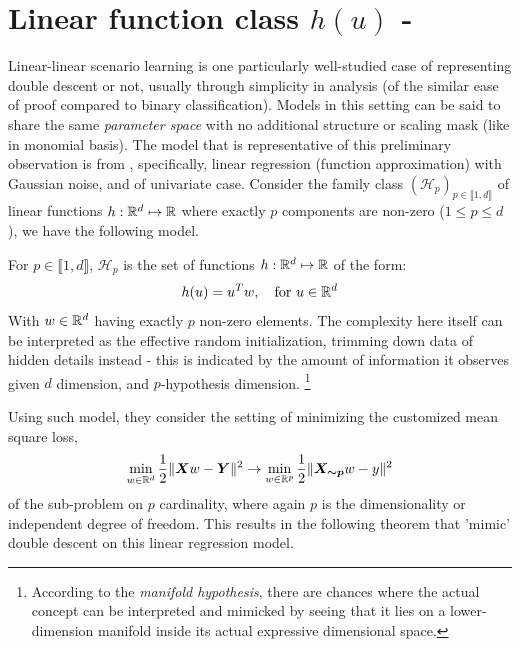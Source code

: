 \section{Linear function class $h(u)$ - \cite{lafon_understanding_2024}}

Linear-linear scenario learning is one particularly well-studied case of representing double descent or not, usually through simplicity in analysis (of the similar ease of proof compared to binary classification). Models in this setting can be said to share the same \textit{parameter space} with no additional structure or scaling mask (like in monomial basis). The model that is representative of this preliminary observation is from \cite{lafon_understanding_2024}, specifically, linear regression (function approximation) with Gaussian noise, and of univariate case. Consider the family class $(\mathcal{H}_p)_{p\in\llbracket1,d\rrbracket}$ of linear functions $h:\mathbb{R}^d\mapsto \mathbb{R}$ where exactly $p$ components are non-zero ($1\leq p\leq d$), we have the following model.

\begin{definition}
For $p \in \llbracket1,d\rrbracket$, $\mathcal{H}_p$ is the set of functions $h:\mathbb{R}^d\mapsto \mathbb{R}$ of the form:
$$
h(u)=u^Tw,\quad \text{for }u \in \mathbb{R}^d
$$
With $w \in \mathbb{R}^d$ having exactly $p$ non-zero elements. The complexity here itself can be interpreted as the effective random initialization, trimming down data of hidden details instead - this is indicated by the amount of information it observes given $d$ dimension, and $p$-hypothesis dimension. \footnote{According to the \textit{manifold hypothesis}, there are chances where the actual concept can be interpreted and mimicked by seeing that it lies on a lower-dimension manifold inside its actual expressive dimensional space. }
\end{definition}
Using such model, they consider the setting of minimizing the customized mean square loss, 
\begin{equation}
\label{eq:linear_gaussian_erm}
\min_{w\in \mathbb{R}^d} \frac{1}{2}\lVert \bm{X} w - \bm{Y} \rVert^2 \to \min_{w\in \mathbb{R}^p} \frac{1}{2}\lVert \bm{X_{\sim p}} w - y \rVert^2
\end{equation}
of the sub-problem on $p$ cardinality, where again $p$ is the dimensionality or independent degree of freedom. This results in the following theorem that 'mimic' double descent on this linear regression model.

